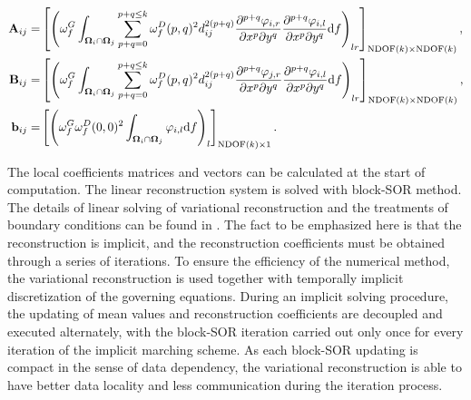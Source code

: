 \documentclass[preprint,12pt]{elsarticle}
\begin{document}
\begin{equation}
    \label{eq:vrCoeffs}
    \begin{aligned}
        \mathbf{A}_{ij} = &
        \left[
            \left({
                \omega_f^G\int_{\OO_i \cap \OO_j}{
                    \sum_{p+q=0}^{p + q\leq k}
                    \omega_f^D(p,q)^2
                    d_{ij}^{2(p+q)}
                    \partialderivative{^{p+q}\varphi_{i,r}}{x^p\partial y^q}
                    \partialderivative{^{p+q}\varphi_{i,l}}{x^p\partial y^q}
                    \dd f}
            }\right)_{lr}
        \right]_{\mathrm{NDOF}(k) \times \mathrm{NDOF}(k)}, \\
        \mathbf{B}_{ij}= &
        \left[
            \left({
                \omega_f^G\int_{\OO_i \cap \OO_j}{
                    \sum_{p+q=0}^{p + q\leq k}
                    \omega_f^D(p,q)^2
                    d_{ij}^{2(p+q)}
                    \partialderivative{^{p+q}\varphi_{j,r}}{x^p\partial y^q}
                    \partialderivative{^{p+q}\varphi_{i,l}}{x^p\partial y^q}
                    \dd f}
            }\right)_{lr}
        \right]_{\mathrm{NDOF}(k) \times \mathrm{NDOF}(k)}, \\
        \mathbf{b}_{ij}= &
        \left[
            \left({
                \omega_f^G\omega_f^D(0,0)^2
                \int_{\OO_i \cap \OO_j}{
                    \varphi_{i,l}
                    \dd f}
            }\right)_{l}
        \right]_{\mathrm{NDOF}(k) \times 1}.\\
    \end{aligned}
\end{equation}

The local coefficients matrices and vectors  can be 
calculated at the start of computation. 
The linear reconstruction system  
is solved with block-SOR method.
The details of linear solving of variational reconstruction and the treatments of 
boundary conditions can be found in \cite{wang2017compact_VR}. 
The fact to be emphasized here is that 
the reconstruction is implicit, and 
the reconstruction coefficients must be 
obtained through a series of 
iterations. 
To ensure the efficiency of the numerical method,
the variational reconstruction is used 
together with temporally implicit discretization 
of the governing equations.
During an implicit solving procedure,
the updating of mean values and reconstruction 
coefficients are decoupled 
and executed alternately, with the block-SOR 
iteration carried out only once for every iteration 
of the implicit marching scheme. 
As each block-SOR updating is compact in the sense of data dependency, 
the variational reconstruction is able to have better data locality and 
less communication during the iteration process.
\end{document}
